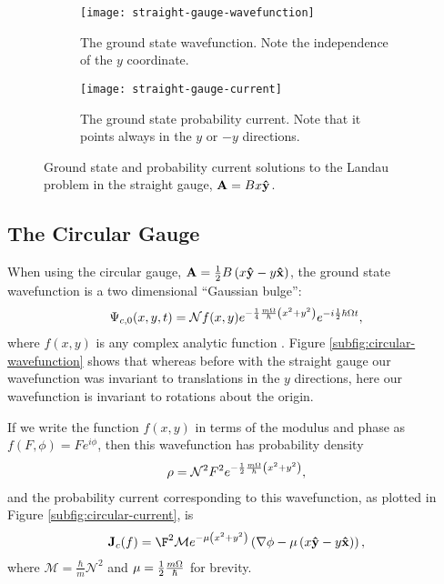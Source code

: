 \begin{figure}
    \centering
    \begin{subfigure}{0.45\linewidth}
        \centering
        \texttt{[image: straight-gauge-wavefunction]}
        \caption{The ground state wavefunction. Note the independence of the $y$
            coordinate.}
        \label{subfig:straight-wavefunction}
    \end{subfigure}
    \begin{subfigure}{0.45\linewidth}
        \centering
        \texttt{[image: straight-gauge-current]}
        \caption{The ground state probability current. Note that it points
            always in the $y$ or $-y$ directions.}
        \label{subfig:straight-current}
    \end{subfigure}
    \caption{Ground state and probability current solutions to the Landau
    problem in the straight gauge, $\mathbf{A} = Bx\mathbf{\hat y }$.}
    \label{fig:straight}
\end{figure}


\subsection{The Circular Gauge}

When using the circular gauge, $\mathbf{A} = \frac{1}{2} B \left( x \mathbf{\hat y } -
y \mathbf{\hat x } \right)$, the ground state wavefunction is a two dimensional
``Gaussian bulge'':
\begin{align}
    \Psi_{c,0}(x, y, t) = \mathcal{N} f(x,y) e^{- \frac{1}{4} \frac{m \Omega}{\hbar} \left( x^2 +
        y^2 \right)} e^{-i \frac{1}{2} \hbar \Omega t},
\end{align}
where $f(x,y)$ is any complex analytic function \cite{murayama}. Figure
\ref{subfig:circular-wavefunction} shows that whereas before with the straight
gauge our wavefunction was invariant to translations in the $y$ directions, here
our wavefunction is invariant to rotations about the origin.

If we write the function $f(x,y)$ in terms of the modulus and phase as
$f(F,\phi) = Fe^{i \phi}$, then this wavefunction has probability density
\begin{align}
    \rho = \mathcal{N}^2 F^2 e^{- \frac{1}{2} \frac{m \Omega}{\hbar} \left( x^2 + y^2 \right)},
    \label{eqn:circular-density}
\end{align}
and the probability current corresponding to this wavefunction, as plotted in
Figure \ref{subfig:circular-current}, is
\begin{align}
    \mathbf{J}_c(f) = \F^2 \mathcal{M} e^{- \mu
        \left( x^2 + y^2 \right)} \left( \nabla \phi - \mu \left(
        x\basis{y} - y\basis{x} \right) \right),
\end{align}
where $\mathcal{M} = \frac{\hbar}{m} \mathcal{N}^2$ and $\mu = \frac{1}{2}
\frac{m \Omega}{\hbar}$ for brevity.

